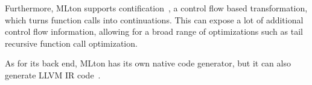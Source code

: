 \documentclass[main.tex]{subfiles}
\begin{document}
	Furthermore, MLton supports contification~\cite{contification}, a control flow based transformation, which turns function calls into continuations. This can expose a lot of additional control flow information, allowing for a broad range of optimizations such as tail recursive function call optimization.
	
	As for its back end, MLton has its own native code generator, but it can also generate LLVM IR code~\cite{mlton-llvm}.
	
	
	
\end{document}
